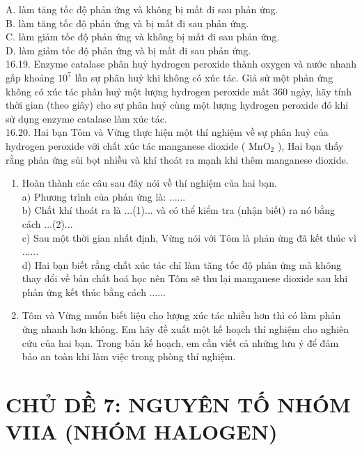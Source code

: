 \documentclass[10pt]{article}
\begin{document}
A. làm tăng tốc độ phản ứng và không bị mất đi sau phản ứng.\\
B. làm tăng tốc độ phản ứng và bị mất đi sau phản ứng.\\
C. làm giảm tốc độ phản ứng và không bị mất đi sau phản ứng.\\
D. làm giảm tốc độ phản ứng và bị mất đi sau phản ứng.\\
16.19. Enzyme catalase phân huỷ hydrogen peroxide thành oxygen và nước nhanh gấp khoảng $10^{7}$ lần sự phân huỷ khi không có xúc tác. Giả sử một phản ứng không có xúc tác phân huỷ một lượng hydrogen peroxide mất 360 ngày, hãy tính thời gian (theo giây) cho sự phân huỷ cùng một lượng hydrogen peroxide đó khi sử dụng enzyme catalase làm xúc tác.\\
16.20. Hai bạn Tôm và Vừng thực hiện một thí nghiệm về sự phân huỷ của hydrogen peroxide với chất xúc tác manganese dioxide ( $\mathrm{MnO}_{2}$ ), Hai bạn thấy rằng phản ứng sủi bọt nhiều và khí thoát ra mạnh khi thêm manganese dioxide.

\begin{enumerate}
  \item Hoàn thành các câu sau đây nói về thí nghiệm của hai bạn.\\
a) Phương trình của phản ứng là: ......\\
b) Chất khí thoát ra là ...(1)... và có thể kiểm tra (nhận biết) ra nó bằng cách ...(2)...\\
c) Sau một thời gian nhất định, Vừng nói với Tôm là phản ứng đã kết thúc vì ......\\
d) Hai bạn biết rằng chất xúc tác chỉ làm tăng tốc độ phản ứng mà không thay đổi về bản chất hoá học nên Tôm sẽ thu lại manganese dioxide sau khi phản ứng kết thúc bằng cách ......
  \item Tôm và Vừng muốn biết liệu cho lượng xúc tác nhiều hơn thì có làm phản ứng nhanh hơn không. Em hãy đề xuất một kế hoạch thí nghiệm cho nghiên cứu của hai bạn. Trong bản kế hoạch, em cần viết cả những lưu ý để đảm bảo an toàn khi làm việc trong phòng thí nghiệm.
\end{enumerate}

\section*{CHỦ DỀ 7: NGUYÊN TỐ NHÓM VIIA (NHÓM HALOGEN)}
\end{document}
